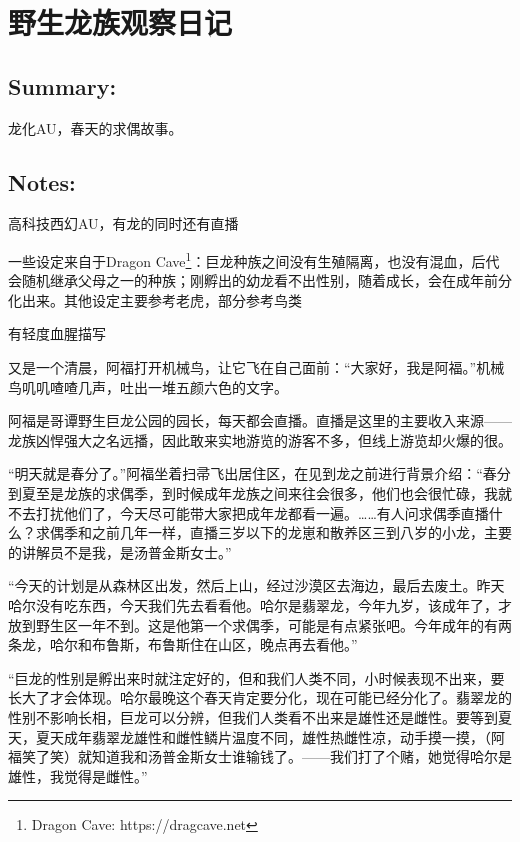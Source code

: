 \documentclass[../main.tex]{subfiles}
\begin{document}
\pagestyle{mystyle}

\chapter{野生龙族观察日记}

\vspace{3cm}

\section*{Summary:}

龙化AU，春天的求偶故事。

\vspace{3em}

\section*{Notes:}
高科技西幻AU，有龙的同时还有直播

一些设定来自于Dragon Cave\footnote[1]{Dragon Cave: https://dragcave.net}：巨龙种族之间没有生殖隔离，也没有混血，后代会随机继承父母之一的种族；刚孵出的幼龙看不出性别，随着成长，会在成年前分化出来。其他设定主要参考老虎，部分参考鸟类

有轻度血腥描写

\newpage

又是一个清晨，阿福打开机械鸟，让它飞在自己面前：“大家好，我是阿福。”机械鸟叽叽喳喳几声，吐出一堆五颜六色的文字。

阿福是哥谭野生巨龙公园的园长，每天都会直播。直播是这里的主要收入来源——龙族凶悍强大之名远播，因此敢来实地游览的游客不多，但线上游览却火爆的很。

“明天就是春分了。”阿福坐着扫帚飞出居住区，在见到龙之前进行背景介绍：“春分到夏至是龙族的求偶季，到时候成年龙族之间来往会很多，他们也会很忙碌，我就不去打扰他们了，今天尽可能带大家把成年龙都看一遍。……有人问求偶季直播什么？求偶季和之前几年一样，直播三岁以下的龙崽和散养区三到八岁的小龙，主要的讲解员不是我，是汤普金斯女士。”

“今天的计划是从森林区出发，然后上山，经过沙漠区去海边，最后去废土。昨天哈尔没有吃东西，今天我们先去看看他。哈尔是翡翠龙，今年九岁，该成年了，才放到野生区一年不到。这是他第一个求偶季，可能是有点紧张吧。今年成年的有两条龙，哈尔和布鲁斯，布鲁斯住在山区，晚点再去看他。”

“巨龙的性别是孵出来时就注定好的，但和我们人类不同，小时候表现不出来，要长大了才会体现。哈尔最晚这个春天肯定要分化，现在可能已经分化了。翡翠龙的性别不影响长相，巨龙可以分辨，但我们人类看不出来是雄性还是雌性。要等到夏天，夏天成年翡翠龙雄性和雌性鳞片温度不同，雄性热雌性凉，动手摸一摸，（阿福笑了笑）就知道我和汤普金斯女士谁输钱了。——我们打了个赌，她觉得哈尔是雄性，我觉得是雌性。”
\end{document}
